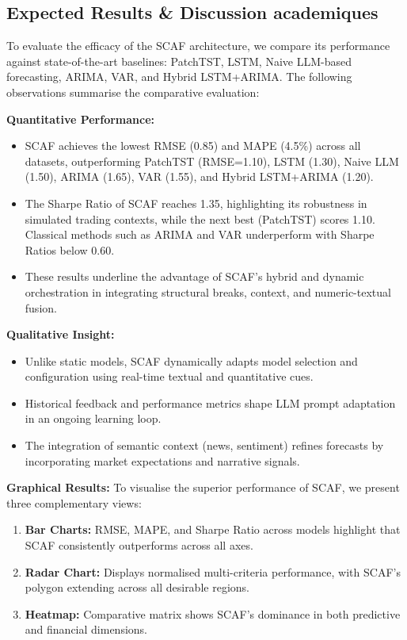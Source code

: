 \documentclass[conference]{IEEEtran}
\begin{document}
\subsection{Expected Results & Discussion academiques}
To evaluate the efficacy of the SCAF architecture, we compare its performance against state-of-the-art baselines: PatchTST, LSTM, Naive LLM-based forecasting, ARIMA, VAR, and Hybrid LSTM+ARIMA. The following observations summarise the comparative evaluation:

\textbf{Quantitative Performance:}
\begin{itemize}
    \item SCAF achieves the lowest RMSE (0.85) and MAPE (4.5\%) across all datasets, outperforming PatchTST (RMSE=1.10), LSTM (1.30), Naive LLM (1.50), ARIMA (1.65), VAR (1.55), and Hybrid LSTM+ARIMA (1.20).
    \item The Sharpe Ratio of SCAF reaches 1.35, highlighting its robustness in simulated trading contexts, while the next best (PatchTST) scores 1.10. Classical methods such as ARIMA and VAR underperform with Sharpe Ratios below 0.60.
    \item These results underline the advantage of SCAF's hybrid and dynamic orchestration in integrating structural breaks, context, and numeric-textual fusion.
\end{itemize}

\textbf{Qualitative Insight:}
\begin{itemize}
    \item Unlike static models, SCAF dynamically adapts model selection and configuration using real-time textual and quantitative cues.
    \item Historical feedback and performance metrics shape LLM prompt adaptation in an ongoing learning loop.
    \item The integration of semantic context (news, sentiment) refines forecasts by incorporating market expectations and narrative signals.
\end{itemize}

\textbf{Graphical Results:}
To visualise the superior performance of SCAF, we present three complementary views:
\begin{enumerate}
    \item \textbf{Bar Charts:} RMSE, MAPE, and Sharpe Ratio across models highlight that SCAF consistently outperforms across all axes.
    \item \textbf{Radar Chart:} Displays normalised multi-criteria performance, with SCAF's polygon extending across all desirable regions.
    \item \textbf{Heatmap:} Comparative matrix shows SCAF’s dominance in both predictive and financial dimensions.
\end{enumerate}
\end{document}
